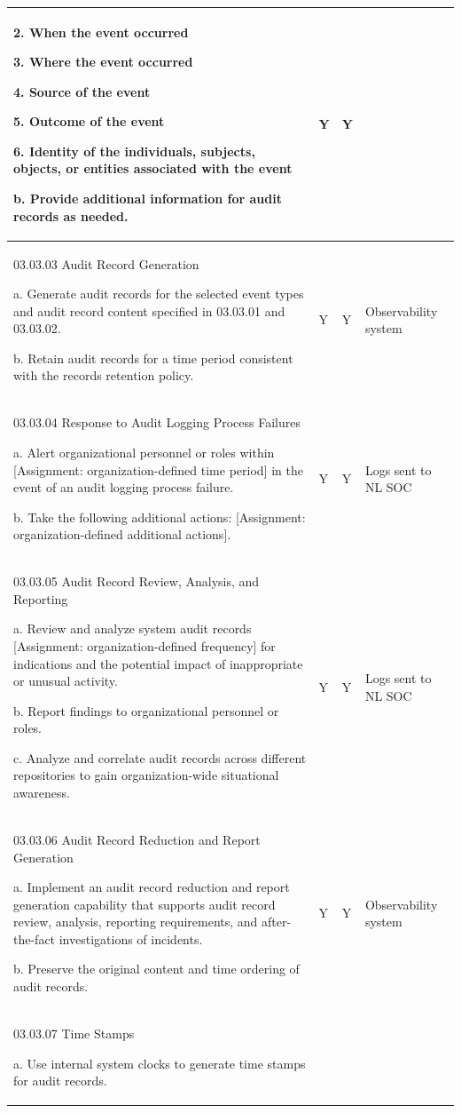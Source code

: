 \begin{longtable} {|p{}|p{}|p{}|p{} |}
{2. When the event occurred

3. Where the event occurred

4. Source of the event

5. Outcome of the event

6. Identity of the individuals, subjects, objects, or entities associated with the event

b. Provide additional information for audit records as needed.}&{Y}&{Y}& \\ \hline
{03.03.03 Audit Record Generation

a. Generate audit records for the selected event types and audit record content specified in 03.03.01 and 03.03.02.

b. Retain audit records for a time period consistent with the records retention policy.}&{Y}&{Y}&{Observability system} \\ \hline
{03.03.04 Response to Audit Logging Process Failures

a. Alert organizational personnel or roles within [Assignment: organization-defined time period] in the event of an audit logging process failure.

b. Take the following additional actions: [Assignment: organization-defined additional actions].}&{Y}&{Y}&{Logs sent to NL SOC} \\ \hline
{03.03.05 Audit Record Review, Analysis, and Reporting

a. Review and analyze system audit records [Assignment: organization-defined frequency] for indications and the potential impact of inappropriate or unusual activity.

b. Report findings to organizational personnel or roles.

c. Analyze and correlate audit records across different repositories to gain organization-wide situational awareness.}&{Y}&{Y}&{Logs sent to NL SOC} \\ \hline
{03.03.06 Audit Record Reduction and Report Generation

a. Implement an audit record reduction and report generation capability that supports audit record review, analysis, reporting requirements, and after-the-fact investigations of incidents.

b. Preserve the original content and time ordering of audit records.}&{Y}&{Y}&{Observability system} \\ \hline
{03.03.07 Time Stamps

a. Use internal system clocks to generate time stamps for audit records.

}
\end{longtable}
